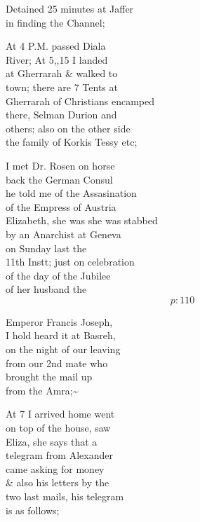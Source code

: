 \documentclass{report}
\begin{document}
	\par{
 	Detained 25 minutes at Jaffer\ \\in finding the Channel;\ \\
	}

	\par{
 	At 4 P.M. passed Diala\ \\River; At 5,,15 I landed\ \\at Gherrarah \& walked to\ \\town; there are 7 Tents at\ \\Gherrarah of Christians encamped\ \\there, Selman Durion and\ \\others; also on the other side\ \\the family of Korkis Tessy etc;\ \\
	}

	\par{
 	I met Dr. Rosen on horse\ \\back the German Consul\ \\he told me of the Assasination\ \\of the Empress of Austria\ \\Elizabeth, she was she was stabbed\ \\by an Anarchist at Geneva\ \\on Sunday last the\ \\11th Instt; just on celebration\ \\of the day of the Jubilee\ \\of her husband the\ \\
  \[p: 110 \]

	}

	\par{
 	Emperor Francis Joseph,\ \\I hold heard it at Basreh,\ \\on the night of our leaving\ \\from our 2nd mate who\ \\brought the mail up\ \\from the Amra;\~{}\ \\
	}

	\par{
 	At 7 I arrived home went\ \\on top of the house, saw\ \\Eliza, she says that a\ \\telegram from Alexander\ \\came asking for money\ \\\& also his letters by the\ \\two last mails, his telegram\ \\is as follows;\ \\
	}
\end{document}
